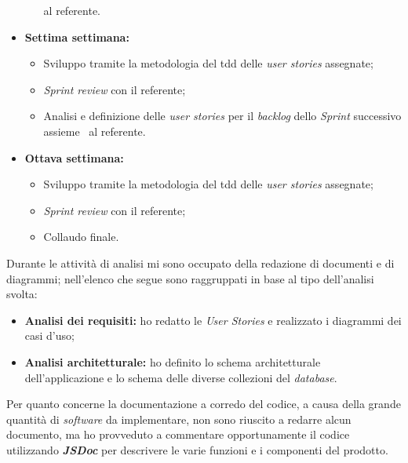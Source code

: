 \begin{itemize}
\begin{itemize}
      al referente.
    \end{itemize}
  \item \textbf{Settima settimana:} 
    \begin{itemize}
      \item Sviluppo tramite la metodologia del \acrshort{tdd} delle \emph{user stories} assegnate;
      \item \emph{Sprint review} con il referente;
      \item Analisi e definizione delle \emph{user stories} per il \emph{backlog} dello \emph{Sprint} successivo assieme \
      al referente.
    \end{itemize}
  \item \textbf{Ottava settimana:} 
    \begin{itemize}
      \item Sviluppo tramite la metodologia del \acrshort{tdd} delle \emph{user stories} assegnate;
      \item \emph{Sprint review} con il referente;
      \item Collaudo finale.
    \end{itemize}
\end{itemize}

Durante le attività di analisi mi sono occupato della redazione di documenti e di diagrammi; nell'elenco che segue sono raggruppati in base al tipo dell'analisi svolta:
\begin{itemize}
  \item \textbf{Analisi dei requisiti:} ho redatto le \emph{User Stories} e realizzato i diagrammi dei casi d'uso;
  \item \textbf{Analisi architetturale:} ho definito lo schema architetturale dell'applicazione e lo schema delle diverse collezioni del \emph{database}.
\end{itemize}

Per quanto concerne la documentazione a corredo del codice, a causa della grande quantità di \emph{software} da implementare, non sono riuscito a redarre alcun documento, ma ho provveduto a commentare opportunamente il codice utilizzando \emph{\textbf{JSDoc}} per descrivere le varie funzioni e i componenti del prodotto.